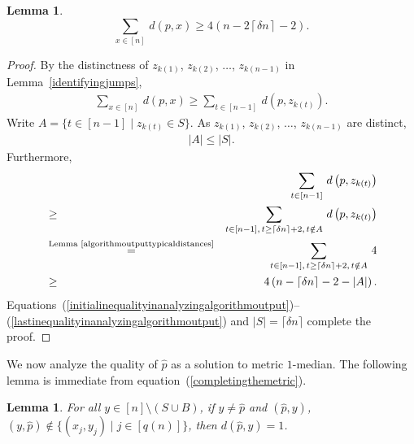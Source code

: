 \documentclass[letterpaper,12pt]{article}
\newtheorem{lemma}[theorem]{Lemma}
\begin{document}
\begin{lemma}\label{analyzingalgorithmoutputassuboptimal}
$$\sum_{x\in[n]}\,d\left(p,x\right)\ge
4\left(n-2\left\lceil\delta n\right\rceil-2\right).$$
\end{lemma}
\begin{proof}
By the distinctness of
$z_{k(1)}$, $z_{k(2)}$, $\ldots$, $z_{k(n-1)}$ in
Lemma~\ref{identifyingjumps},
\begin{eqnarray}
\sum_{x\in[n]}\,d\left(p,x\right)
\ge\sum_{t\in[n-1]}\,d\left(p,z_{k(t)}\right).
\label{initialinequalityinanalyzingalgorithmoutput}
\end{eqnarray}
Write
$A=\{t\in[n-1]\mid z_{k(t)}\in S\}$.
As $z_{k(1)}$, $z_{k(2)}$, $\ldots$, $z_{k(n-1)}$ are distinct,
\begin{eqnarray}
|A|\le |S|.
\end{eqnarray}
Furthermore,
\begin{eqnarray}
&&\sum_{t\in[n-1]}\,d\left(p,z_{k(t)}\right)\nonumber\\
&\ge&\sum_{t\in[n-1],\,t\ge \lceil\delta n\rceil+2,\,t\notin A}\,
d\left(p,z_{k(t)}\right)\nonumber\\
&\stackrel{\text{Lemma~\ref{algorithmoutputtypicaldistances}}}{=}&
\sum_{t\in[n-1],\,t\ge \lceil\delta n\rceil+2,\,t\notin A}\,
4\nonumber\\
&\ge& 4\left(n-\left\lceil\delta n\right\rceil-2-|A|\right).
\label{lastinequalityinanalyzingalgorithmoutput}
\end{eqnarray}
Equations~(\ref{initialinequalityinanalyzingalgorithmoutput})--(\ref{lastinequalityinanalyzingalgorithmoutput})
and $|S|=\lceil\delta n\rceil$ complete the proof.
\end{proof}

We now analyze the quality of $\hat{p}$ as a solution to
{\sc metric $1$-median}.
The following lemma is immediate from
equation~(\ref{completingthemetric}).

\begin{lemma}\label{optimalpointhasmanydistancesbeing1}
For all $y\in [n]\setminus(S\cup B)$,
if
$y\neq \hat{p}$ and
$(\hat{p},y)$, $(y,\hat{p})\notin \{(x_j,y_j)\mid j\in[q(n)]\}$,
then $d(\hat{p},y)=1$.
\end{lemma}
\end{document}
